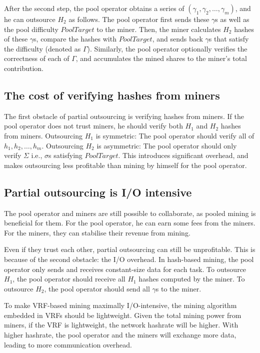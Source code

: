 After the second step, the pool operator obtains a series of $(\gamma_1, \gamma_2, \dots, \gamma_m)$, and he can outsource $H_2$ as follows.
The pool operator first sends these $\gamma$s as well as the pool difficulty $PoolTarget$ to the miner.
Then, the miner calculates $H_2$ hashes of these $\gamma$s, compare the hashes with $PoolTarget$, and sends back $\gamma$s that satisfy the difficulty (denoted as $\Gamma$).
Similarly, the pool operator optionally verifies the correctness of each of $\Gamma$, and accumulates the mined shares to the miner's total contribution.


\subsection{The cost of verifying hashes from miners}

The first obstacle of partial outsourcing is verifying hashes from miners.
If the pool operator does not trust miners, he should verify both $H_1$ and $H_2$ hashes from miners.
Outsourcing $H_1$ is symmetric: The pool operator should verify all of $h_1, h_2, \dots, h_m$.
Outsourcing $H_2$ is asymmetric: The pool operator should only verify $\Sigma$ i.e., $\sigma$s satisfying $PoolTarget$.
This introduces significant overhead, and makes outsourcing less profitable than mining by himself for the pool operator.


\subsection{Partial outsourcing is I/O intensive}

The pool operator and miners are still possible to collaborate, as pooled mining is beneficial for them.
For the pool operator, he can earn some fees from the miners.
For the miners, they can stabilise their revenue from mining.

Even if they trust each other, partial outsourcing can still be unprofitable.
This is because of the second obstacle: the I/O overhead.
In hash-based mining, the pool operator only sends and receives constant-size data for each task.
To outsource $H_1$, the pool operator should receive all $H_1$ hashes computed by the miner.
To outsource $H_2$, the pool operator should send all $\gamma$s to the miner.

To make VRF-based mining maximally I/O-intensive, the mining algorithm embedded in VRFs should be lightweight.
Given the total mining power from miners, if the VRF is lightweight, the network hashrate will be higher.
With higher hashrate, the pool operator and the miners will exchange more data, leading to more communication overhead.
